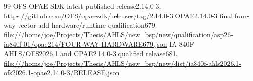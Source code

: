 \begin{thebibliography}{99}
 OFS OPAE SDK latest published release2.14.0-3.
\newline\url{https://github.com/OFS/opae-sdk/releases/tag/2.14.0-3}
 OPAE2.14.0-3 final four-way vector-add hardware/runtime qualification679.
\newline\url{file:///home/joe/Projects/Thesis/AHLS/new_bsp/new/qualification/asp26-ia840f-01/opae214/FOUR-WAY-HARDWARE679.json}
 IA-840F AHLS/OFS2026.1 and OPAE2.14.0-3 qualified release681.
\newline\url{file:///home/joe/Projects/Thesis/AHLS/new_bsp/new/dist/ia840f-ahls2026.1-ofs2026.1-opae2.14.0-3/RELEASE.json}
\end{thebibliography}
\endgroup
